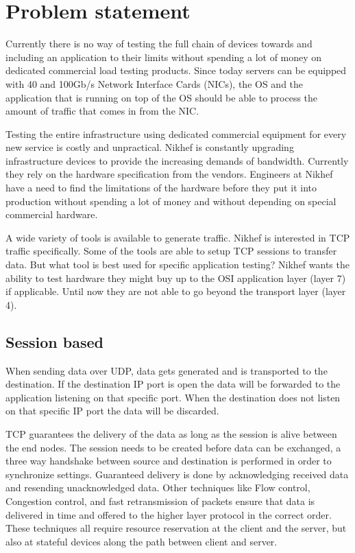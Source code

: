 \chapter{Problem statement}\label{ch:problem}

Currently there is no way of testing the full chain of devices towards and including an application to their limits without spending a lot of money on dedicated commercial load testing products.
Since today servers can be equipped with 40 and 100Gb/s Network Interface Cards (NICs), the OS and the application that is running on top of the OS should be able to process the amount of traffic that comes in from the NIC.

Testing the entire infrastructure using dedicated commercial equipment for every new service is costly and unpractical.
Nikhef is constantly upgrading infrastructure devices to provide the increasing demands of bandwidth. Currently they rely on the hardware specification from the vendors. 
Engineers at Nikhef have a need to find the limitations of the hardware before they put it into production without spending a lot of money and without depending on special commercial hardware.
 
A wide variety of tools is available to generate traffic. Nikhef is interested in TCP traffic specifically.  
Some of the tools are able to setup TCP sessions to transfer data. But what tool is best used for specific application testing?   
Nikhef wants the ability to test hardware they might buy up to the OSI application layer (layer 7) if applicable. 
Until now they are not able to go beyond the transport layer (layer 4).

\section{Session based}\label{sec:sessionbased}
When sending data over UDP, data gets generated and is transported to the destination. 
If the destination IP port is open the data will be forwarded to the application listening on that specific port.
When the destination does not listen on that specific IP port the data will be discarded. 
 
TCP guarantees the delivery of the data as long as the session is alive between the end nodes.
The session needs to be created before data can be exchanged, a three way handshake between source and destination is performed in order to synchronize settings. 
Guaranteed delivery is done by acknowledging received data and resending unacknowledged data. 
Other techniques like Flow control, Congestion control, and fast retransmission of packets ensure that data is delivered in time and offered to the higher layer protocol in the correct order. 
These techniques all require resource reservation at the client and the server, but also at stateful devices along the path between client and server. 

